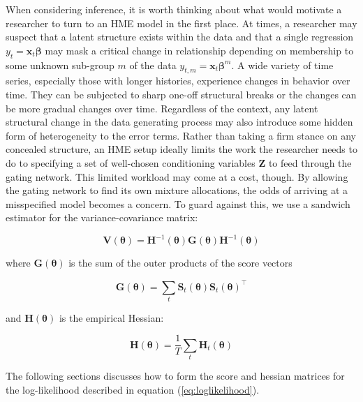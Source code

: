 \documentclass[12pt]{article}
\newcommand{\Ht}[1]{\mathbf{H}_{t}(#1)}
\newcommand{\HH}[1]{\boldsymbol{H}(#1)}
\newcommand{\HI}[1]{\boldsymbol{H}^{-1}(#1)}
\begin{document}
When considering inference, it is worth thinking about what would motivate
a researcher to turn to an HME model in the first place. At times,
a researcher may suspect that a latent structure exists within the data
and that a single regression $y_{t} = \boldsymbol{x}_{t} \boldsymbol{\beta}$
may mask a critical change in relationship depending on membership to
some unknown sub-group $m$ of the data $y_{t,m} = \boldsymbol{x}_{t} \boldsymbol{\beta}^{m}$.
A wide variety of time series, especially those with longer histories,
experience changes in behavior over time. They can be subjected to sharp one-off
structural breaks or the changes can be more gradual changes over time. Regardless of
the context, any latent structural change in the data generating
process may also introduce some hidden form of heterogeneity to the error terms. 
Rather than taking a firm stance on any concealed structure, an HME
setup ideally limits the work the researcher needs to do to specifying
a set of well-chosen conditioning variables $\boldsymbol{Z}$ to feed through the gating
network. This limited workload may come at a cost, though. By allowing the 
gating network to find its own mixture allocations, the odds of arriving at a
misspecified model becomes a concern. To guard against this, we use a sandwich
estimator for the variance-covariance matrix:

\begin{equation} \label{eq:robustgatevarcov}
  \boldsymbol{V}(\boldsymbol{\theta}) = \HI{\boldsymbol{\theta}} \boldsymbol{G}(\boldsymbol{\theta}) \HI{\boldsymbol{\theta}}
\end{equation}

where $\boldsymbol{G}(\boldsymbol{\theta})$ is the sum of the outer products of the score 
vectors

\begin{equation}
  \boldsymbol{G}(\boldsymbol{\theta}) = \sum_{t} \boldsymbol{S}_{t}(\boldsymbol{\theta}) \boldsymbol{S}_{t}(\boldsymbol{\theta})^\top
\end{equation}

and $\HH{\boldsymbol{\theta}}$ is the empirical Hessian:

\begin{equation}
  \HH{\boldsymbol{\theta}} = \frac{1}{T} \sum_{t} \Ht{\boldsymbol{\theta}}
\end{equation}

The following sections discusses how to form the score and hessian matrices 
for the log-likelihood described in equation (\ref{eq:loglikelihood}).
\end{document}
